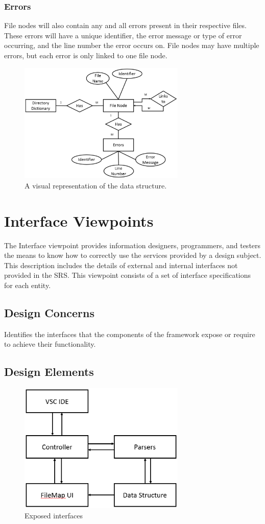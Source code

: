 \documentclass[letterpaper,10pt,titlepage,draftclsnofoot,onecolumn,onesided] {IEEEtran}
\begin{document}
\subsubsection{Errors}
File nodes will also contain any and all errors present in their respective files.
These errors will have a unique identifier, the error message or type of error occurring, and the line number the error occurs on.
File nodes may have multiple errors, but each error is only linked to one file node.

\begin{figure}
	\includegraphics[width=300px]{InformationERDEPS.eps}
	\caption{A visual representation of the data structure.}
\end{figure}
				
\section{Interface Viewpoints}
The Interface viewpoint provides information designers, programmers, and testers the means to know how
to correctly use the services provided by a design subject. This description includes the details of external
and internal interfaces not provided in the SRS. This viewpoint consists of a set of interface specifications
for each entity. 
\subsection{Design Concerns}
Identifies the interfaces that the components of the framework expose or require to achieve their
functionality. 
\subsection{Design Elements}

\begin{figure}
\includegraphics[width=300px]{InterfaceUMLEPS.eps}
	\caption{Exposed interfaces}
\end{figure}
\end{document}

